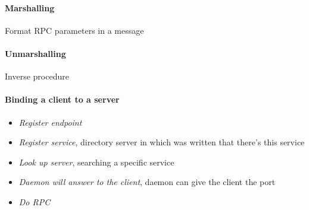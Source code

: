 \paragraph{Marshalling}
Format RPC parameters in a message

\paragraph{Unmarshalling}
Inverse procedure

\paragraph{Binding a client to a server}
\begin{itemize}
    \item \textit{Register endpoint}
    \item \textit{Register service}, directory server in which was written that there’s this service
    \item \textit{Look up server}, searching a specific service
    \item \textit{Daemon will answer to the client}, daemon can give the client the port
    \item \textit{Do RPC}
\end{itemize}

\newpage